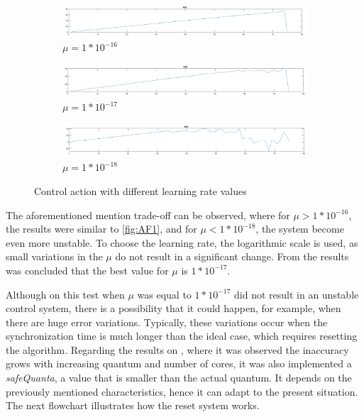 \begin{figure}
\centering
\begin{subfigure}{\textwidth}
    \includegraphics[width=\textwidth]{Images/AF1.png}
    \caption{ $\mu = 1 * 10^{-16} $ }
    \label{fig:AF1}
\end{subfigure}
\begin{subfigure}{\textwidth}
    \includegraphics[width=\textwidth]{Images/AF2.png}
    \caption{ $\mu = 1 * 10^{-17}$ }
    \label{fig:AF2}
\end{subfigure}
\begin{subfigure}{\textwidth}
    \includegraphics[width=\textwidth]{Images/AF3.png}
    \caption{ $\mu = 1 * 10^{-18}$ }
    \label{fig:AF3}
\end{subfigure}
        
\caption{Control action with different learning rate values}
\label{fig:learningRateTests}
\end{figure}

 The aforementioned mention trade-off can be observed, where for $\mu > 1 * 10^{-16} $, the results were similar to \autoref{fig:AF1}, and 
 for $\mu < 1 * 10^{-18} $, the system become even more unstable. To choose the learning rate, the logarithmic scale is used, as small variations 
 in the $\mu$ do not result in a significant change. From the results was concluded that the best value for $\mu$ is $1 * 10^{-17}$. 

Although on this test when $\mu$ was equal to $1 * 10^{-17}$ did not result in an unstable control system, there is a possibility that it could 
happen, for example, when there are huge error variations. Typically, these variations occur when the synchronization time is much longer than the 
ideal case, which requires resetting the algorithm. Regarding the results on \cite{pargem5}, where it was observed the inaccuracy grows with 
increasing quantum and number of cores, it was also implemented a \textit{safeQuanta}, a value that is smaller than the actual quantum. It depends 
on the previously mentioned characteristics, hence it can adapt to the present situation. The next flowchart illustrates how the reset system works.


